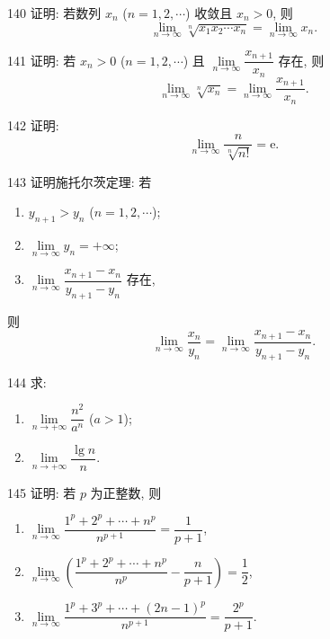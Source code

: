 \begin{prob}[M]{140}
证明: 若数列 $x_n$ ($n = 1, 2, \cdots$) 收敛且 $x_n > 0$, 则
\[
\lim_{n\to\infty} \sqrt[n]{x_1 x_2 \cdots x_n} = \lim_{n\to\infty} x_n.
\]
\end{prob}

\begin{prob}[M]{141}
证明: 若 $x_n > 0$ ($n = 1, 2, \cdots$) 且 $\lim\limits_{n\to\infty} \dfrac{x_{n+1}}{x_n}$ 存在, 则
\[
\lim_{n\to\infty} \sqrt[n]{x_n} = \lim_{n\to\infty} \frac{x_{n+1}}{x_n}.
\]
\end{prob}

\begin{prob}[M]{142}
证明:
\[
\lim_{n\to\infty} \frac{n}{\sqrt[n]{n!}} = \mathrm{e}.
\]
\end{prob}

\begin{prob}[L]{143}
证明施托尔茨定理: 若
\begin{enumerate}[label=(\alph*), itemsep=2pt, topsep=3pt]
  \item $y_{n+1} > y_n$ ($n = 1, 2, \cdots$);
  \item $\lim\limits_{n\to\infty} y_n = +\infty$;
  \item $\lim\limits_{n\to\infty} \dfrac{x_{n+1} - x_n}{y_{n+1} - y_n}$ 存在,
\end{enumerate}
则
\[
\lim_{n\to\infty} \frac{x_n}{y_n} = \lim_{n\to\infty} \frac{x_{n+1} - x_n}{y_{n+1} - y_n}.
\]
\end{prob}

\begin{prob}[M]{144}
求:
\begin{enumerate}[label=(\alph*), itemsep=2pt, topsep=3pt]
  \item $\lim\limits_{n\to+\infty} \dfrac{n^2}{a^n}$ ($a > 1$);
  \item $\lim\limits_{n\to+\infty} \dfrac{\lg n}{n}$.
\end{enumerate}
\end{prob}

\begin{prob}[L]{145}
证明: 若 $p$ 为正整数, 则
\begin{enumerate}[label=(\alph*), itemsep=2pt, topsep=3pt]
  \item $\lim\limits_{n\to\infty} \dfrac{1^p + 2^p + \cdots + n^p}{n^{p+1}} = \dfrac{1}{p+1}$,
  \item $\lim\limits_{n\to\infty} \left(\dfrac{1^p + 2^p + \cdots + n^p}{n^p} - \dfrac{n}{p+1}\right) = \dfrac{1}{2}$,
  \item $\lim\limits_{n\to\infty} \dfrac{1^p + 3^p + \cdots + (2n-1)^p}{n^{p+1}} = \dfrac{2^p}{p+1}$.
\end{enumerate}
\end{prob}

